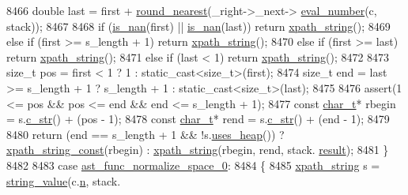 \begin{DoxyCode}
8466                 \textcolor{keywordtype}{double} last = first + \hyperlink{pugixml_8cpp_aaeb62784a181c44f2ee34c0172e00240}{round\_nearest}(\_right->\_next->
      \hyperlink{classxpath__ast__node_a92dd7048e28d486bc7f382d1fc6f1de6}{eval\_number}(c, stack));
8467                 
8468                 \textcolor{keywordflow}{if} (\hyperlink{pugixml_8cpp_ac5a4735a6c75f496aa9e2868216ad32e}{is\_nan}(first) || \hyperlink{pugixml_8cpp_ac5a4735a6c75f496aa9e2868216ad32e}{is\_nan}(last)) \textcolor{keywordflow}{return} 
      \hyperlink{classxpath__string}{xpath\_string}();
8469                 \textcolor{keywordflow}{else} \textcolor{keywordflow}{if} (first >= s\_length + 1) \textcolor{keywordflow}{return} \hyperlink{classxpath__string}{xpath\_string}();
8470                 \textcolor{keywordflow}{else} \textcolor{keywordflow}{if} (first >= last) \textcolor{keywordflow}{return} \hyperlink{classxpath__string}{xpath\_string}();
8471                 \textcolor{keywordflow}{else} \textcolor{keywordflow}{if} (last < 1) \textcolor{keywordflow}{return} \hyperlink{classxpath__string}{xpath\_string}();
8472                 
8473                 \textcolor{keywordtype}{size\_t} pos = first < 1 ? 1 : static\_cast<size\_t>(first);
8474                 \textcolor{keywordtype}{size\_t} end = last >= s\_length + 1 ? s\_length + 1 : \textcolor{keyword}{static\_cast<}\textcolor{keywordtype}{size\_t}\textcolor{keyword}{>}(last);
8475 
8476                 assert(1 <= pos && pos <= end && end <= s\_length + 1);
8477                 \textcolor{keyword}{const} \hyperlink{namespacepugi_aef5a7a62cba0507542220ea15afe39df}{char\_t}* rbegin = s.\hyperlink{classxpath__string_a0c5d08cda063f380e065f87041d20b39}{c\_str}() + (pos - 1);
8478                 \textcolor{keyword}{const} \hyperlink{namespacepugi_aef5a7a62cba0507542220ea15afe39df}{char\_t}* rend = s.\hyperlink{classxpath__string_a0c5d08cda063f380e065f87041d20b39}{c\_str}() + (end - 1);
8479 
8480                 \textcolor{keywordflow}{return} (end == s\_length + 1 && !s.\hyperlink{classxpath__string_ac8cab48475690223df758e5ab2368533}{uses\_heap}()) ? 
      \hyperlink{pugixml_8cpp_af98444c6604376907823f1d20acac2bd}{xpath\_string\_const}(rbegin) : \hyperlink{classxpath__string}{xpath\_string}(rbegin, rend, stack.
      \hyperlink{structxpath__stack_adce164b779cbb3d1bc093a772067ea7e}{result});
8481             \}
8482 
8483             \textcolor{keywordflow}{case} \hyperlink{pugixml_8cpp_a11258a240266b84b6b0526930e5d330daa46c67b12851bceec7f56d2bef299145}{ast\_func\_normalize\_space\_0}:
8484             \{
8485                 \hyperlink{classxpath__string}{xpath\_string} s = \hyperlink{pugixml_8cpp_a7983b03f2dd06eb98951cd2dde03cd87}{string\_value}(c.\hyperlink{structxpath__context_ace8fbb8121820bc5054605c166101273}{n}, stack.

\end{DoxyCode}
